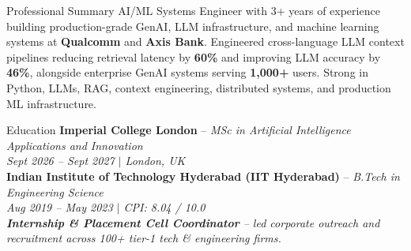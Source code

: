 \documentclass[11pt]{resume}
\begin{document}


\begin{rSection}{Professional Summary}
AI/ML Systems Engineer with 3+ years of experience building production-grade GenAI, LLM infrastructure, and machine learning systems at \textbf{Qualcomm} and \textbf{Axis Bank}. Engineered cross-language LLM context pipelines reducing retrieval latency by \textbf{60\%} and improving LLM accuracy by \textbf{46\%}, alongside enterprise GenAI systems serving \textbf{1,000+} users. Strong in Python, LLMs, RAG, context engineering, distributed systems, and production ML infrastructure.
\end{rSection}



\begin{rSection}{Education}
{\bf Imperial College London} -- {\em MSc in Artificial Intelligence Applications and Innovation} \\
{\em Sept 2026 -- Sept 2027 $|$ London, UK} \\[0.05em]
{\bf Indian Institute of Technology Hyderabad (IIT Hyderabad)} -- {\em B.Tech in Engineering Science} \\
{\em Aug 2019 -- May 2023 $|$ CPI: 8.04 / 10.0} \\
\textit{\textbf{Internship \& Placement Cell Coordinator} -- led corporate outreach and recruitment across 100+ tier-1 tech \& engineering firms.}
\end{rSection}

\end{document}

